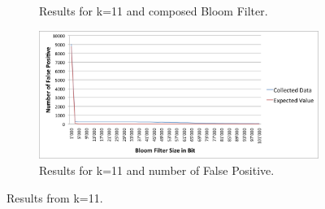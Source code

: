 \documentclass[12]{scrartcl}
\begin{document}
\begin{figure}[H]
\begin{subfigure}[t]{\textwidth}
\begin{center}
		\end{center}
		\caption{Results for k=11 and composed Bloom Filter.}
	\end{subfigure}
	\begin{subfigure}[t]{\textwidth}
		\begin{center}
			\includegraphics[scale=0.3]{res/11-fp.png}
		\end{center}
		\caption{Results for k=11 and number of False Positive.}
	\end{subfigure}
	\caption{Results from k=11.}
\end{figure}
\end{document}
